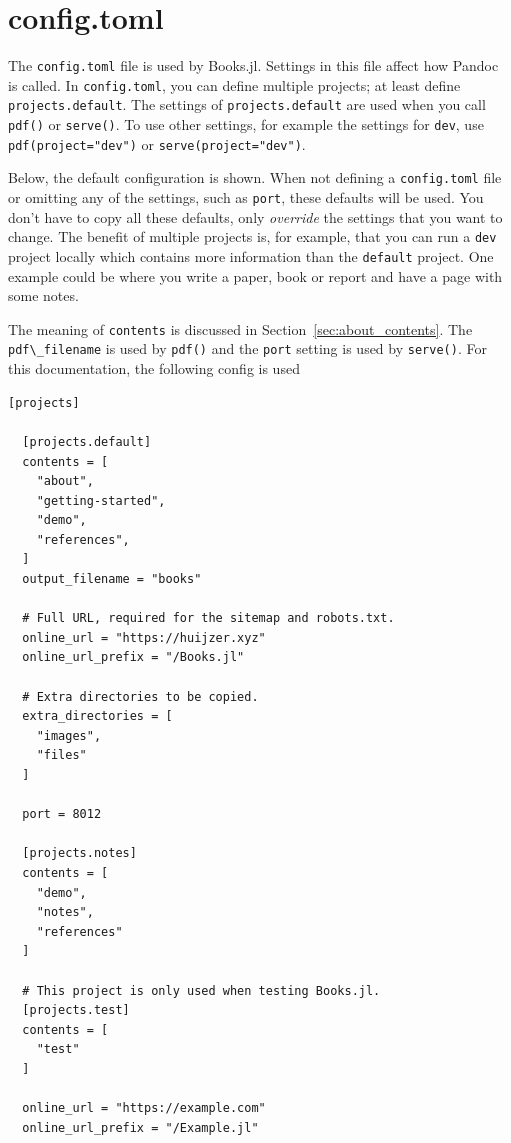 \documentclass[
  notoc %
]{tufte-book}
\newcommand{\passthrough}[1]{#1}
\begin{document}
\hypertarget{sec:config}{%
\section{config.toml}\label{sec:config}}

The \passthrough{\lstinline!config.toml!} file is used by Books.jl.
Settings in this file affect how Pandoc is called. In
\passthrough{\lstinline!config.toml!}, you can define multiple projects;
at least define \passthrough{\lstinline!projects.default!}. The settings
of \passthrough{\lstinline!projects.default!} are used when you call
\passthrough{\lstinline!pdf()!} or \passthrough{\lstinline!serve()!}. To
use other settings, for example the settings for
\passthrough{\lstinline!dev!}, use
\passthrough{\lstinline!pdf(project="dev")!} or
\passthrough{\lstinline!serve(project="dev")!}.

Below, the default configuration is shown. When not defining a
\passthrough{\lstinline!config.toml!} file or omitting any of the
settings, such as \passthrough{\lstinline!port!}, these defaults will be
used. You don't have to copy all these defaults, only \emph{override}
the settings that you want to change. The benefit of multiple projects
is, for example, that you can run a \passthrough{\lstinline!dev!}
project locally which contains more information than the
\passthrough{\lstinline!default!} project. One example could be where
you write a paper, book or report and have a page with some notes.

The meaning of \passthrough{\lstinline!contents!} is discussed in
Section~\ref{sec:about_contents}. The
\passthrough{\lstinline!pdf\_filename!} is used by
\passthrough{\lstinline!pdf()!} and the \passthrough{\lstinline!port!}
setting is used by \passthrough{\lstinline!serve()!}. For this
documentation, the following config is used

\begin{lstlisting}[language=Output]
[projects]

  [projects.default]
  contents = [
    "about",
    "getting-started",
    "demo",
    "references",
  ]
  output_filename = "books"

  # Full URL, required for the sitemap and robots.txt.
  online_url = "https://huijzer.xyz"
  online_url_prefix = "/Books.jl"

  # Extra directories to be copied.
  extra_directories = [
    "images",
    "files"
  ]

  port = 8012

  [projects.notes]
  contents = [
    "demo",
    "notes",
    "references"
  ]

  # This project is only used when testing Books.jl.
  [projects.test]
  contents = [
    "test"
  ]

  online_url = "https://example.com"
  online_url_prefix = "/Example.jl"


\end{lstlisting}
\end{document}
